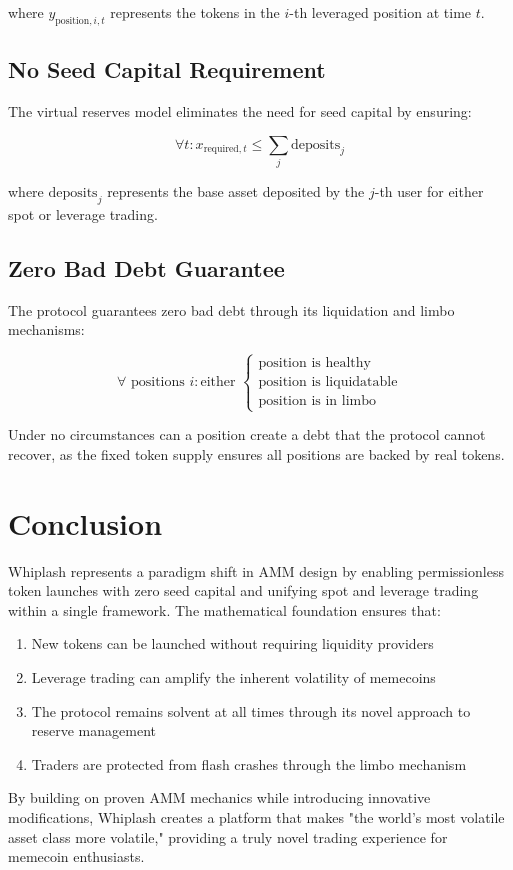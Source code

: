 \documentclass[11pt]{article}
\begin{document}
where $y_{\text{position},i,t}$ represents the tokens in the $i$-th leveraged position at time $t$.

\subsection{No Seed Capital Requirement}

The virtual reserves model eliminates the need for seed capital by ensuring:

\begin{equation}
\forall t: x_{\text{required},t} \leq \sum_{j} \text{deposits}_j
\end{equation}

where $\text{deposits}_j$ represents the base asset deposited by the $j$-th user for either spot or leverage trading.

\subsection{Zero Bad Debt Guarantee}

The protocol guarantees zero bad debt through its liquidation and limbo mechanisms:

\begin{equation}
\forall \text{ positions } i: \text{either } \begin{cases}
\text{position is healthy} \\
\text{position is liquidatable} \\
\text{position is in limbo}
\end{cases}
\end{equation}

Under no circumstances can a position create a debt that the protocol cannot recover, as the fixed token supply ensures all positions are backed by real tokens.

\section{Conclusion}

Whiplash represents a paradigm shift in AMM design by enabling permissionless token launches with zero seed capital and unifying spot and leverage trading within a single framework. The mathematical foundation ensures that:

\begin{enumerate}
    \item New tokens can be launched without requiring liquidity providers
    \item Leverage trading can amplify the inherent volatility of memecoins
    \item The protocol remains solvent at all times through its novel approach to reserve management
    \item Traders are protected from flash crashes through the limbo mechanism
\end{enumerate}

By building on proven AMM mechanics while introducing innovative modifications, Whiplash creates a platform that makes "the world's most volatile asset class more volatile," providing a truly novel trading experience for memecoin enthusiasts.
\end{document}
